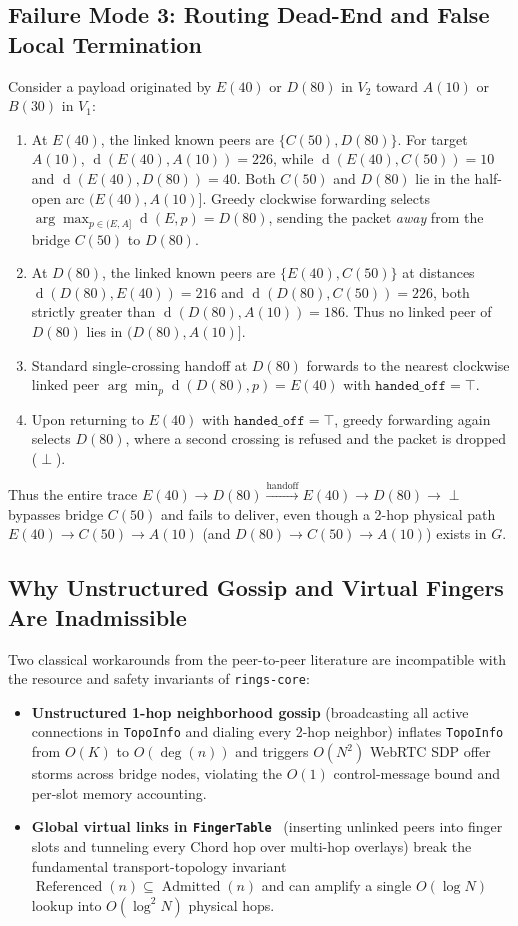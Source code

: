 \documentclass[journal]{IEEEtran}
\newcommand{\dist}{\operatorname{d}}
\newcommand{\Admitted}{\operatorname{Admitted}}
\newcommand{\Referenced}{\operatorname{Referenced}}
\begin{document}
\subsection{Failure Mode 3: Routing Dead-End and False Local Termination}
Consider a payload originated by $E(40)$ or $D(80)$ in $V_2$ toward $A(10)$ or
$B(30)$ in $V_1$:
\begin{enumerate}
  \item At $E(40)$, the linked known peers are $\{C(50), D(80)\}$. For target
  $A(10)$, $\dist(E(40), A(10)) = 226$, while $\dist(E(40), C(50)) = 10$ and
  $\dist(E(40), D(80)) = 40$. Both $C(50)$ and $D(80)$ lie in the half-open arc
  $(E(40), A(10)]$. Greedy clockwise forwarding selects
  $\arg\max_{p \in (E, A]} \dist(E, p) = D(80)$, sending the packet \emph{away}
  from the bridge $C(50)$ to $D(80)$.
  \item At $D(80)$, the linked known peers are $\{E(40), C(50)\}$ at distances
  $\dist(D(80), E(40)) = 216$ and $\dist(D(80), C(50)) = 226$, both strictly
  greater than $\dist(D(80), A(10)) = 186$. Thus no linked peer of $D(80)$ lies
  in $(D(80), A(10)]$.
  \item Standard single-crossing handoff at $D(80)$ forwards to the nearest
  clockwise linked peer $\arg\min_{p} \dist(D(80), p) = E(40)$ with
  $\texttt{handed\_off} = \top$.
  \item Upon returning to $E(40)$ with $\texttt{handed\_off} = \top$, greedy
  forwarding again selects $D(80)$, where a second crossing is refused and the
  packet is dropped ($\perp$).
\end{enumerate}
Thus the entire trace $E(40) \to D(80) \xrightarrow{\text{handoff}} E(40) \to
D(80) \to \perp$ bypasses bridge $C(50)$ and fails to deliver, even though a
2-hop physical path $E(40) \to C(50) \to A(10)$ (and $D(80) \to C(50) \to
A(10)$) exists in $G$.

\subsection{Why Unstructured Gossip and Virtual Fingers Are Inadmissible}
Two classical workarounds from the peer-to-peer literature are incompatible
with the resource and safety invariants of \texttt{rings-core}:
\begin{itemize}
  \item \textbf{Unstructured 1-hop neighborhood gossip} (broadcasting all active
  connections in \texttt{TopoInfo} and dialing every 2-hop neighbor) inflates
  \texttt{TopoInfo} from $O(K)$ to $O(\operatorname{deg}(n))$ and triggers
  $O(N^2)$ WebRTC SDP offer storms across bridge nodes, violating the $O(1)$
  control-message bound and per-slot memory accounting.
  \item \textbf{Global virtual links in \texttt{FingerTable}}~\cite{Bryan2008,RFC8840}
  (inserting unlinked peers into finger slots and tunneling every Chord hop over
  multi-hop overlays) break the fundamental transport-topology invariant
  $\Referenced(n) \subseteq \Admitted(n)$ and can amplify a single $O(\log N)$
  lookup into $O(\log^2 N)$ physical hops.
\end{itemize}
\end{document}
